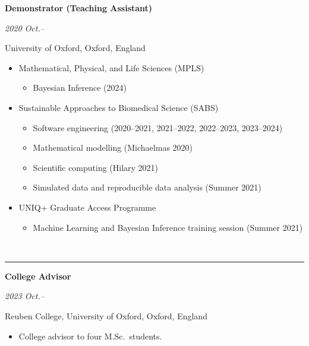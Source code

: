 \documentclass[10pt]{article}
\begin{document}
\vspace{0.2cm}


\noindent\parbox{.65\textwidth}{\raggedright  \textbf{Demonstrator (Teaching Assistant)}}
\parbox{.35\textwidth}{\raggedleft \emph{2020 Oct.--}}
University of Oxford, Oxford, England
\begin{itemize}
\setlength{\itemsep}{0pt}
\item Mathematical, Physical, and Life Sciences (MPLS)
\begin{itemize}
\vspace{-.2cm}
\setlength{\itemsep}{0pt}
    \item Bayesian Inference (2024)
\end{itemize}
\item Sustainable Approaches to Biomedical Science (SABS)
\begin{itemize}
\vspace{-.2cm}
\setlength{\itemsep}{0pt}
\item Software engineering (2020--2021, 2021--2022, 2022--2023, 2023--2024)
\item Mathematical modelling (Michaelmas 2020)
\item Scientific computing (Hilary 2021)
\item Simulated data and reproducible data analysis (Summer 2021)
\end{itemize}
\item UNIQ+ Graduate Access Programme
\begin{itemize}
\vspace{-.2cm}
\setlength{\itemsep}{0pt}
\item Machine Learning and Bayesian Inference training session (Summer 2021)
\end{itemize}
\end{itemize}




\vspace{0.6cm}




\vspace{-2.75mm} \\
\rule{\textwidth}{0.4pt}
\vspace{0.1mm}
\noindent\parbox{.65\textwidth}{\raggedright  \textbf{College Advisor}}
\parbox{.35\textwidth}{\raggedleft \emph{2023 Oct.--}}
Reuben College, University of Oxford, Oxford, England
\begin{itemize}
\vspace{-.2cm}
\setlength{\itemsep}{0pt}
\item College advisor to four M.Sc.\ students.
\end{itemize}
\end{document}
